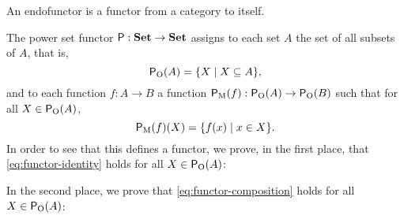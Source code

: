 \begin{definition}
  \label{def:endofunctor}

  An endofunctor is a functor from a category to itself.

\end{definition}


\begin{example}
  \label{ex:functor-power-set}


  The power set functor $\mathsf{P}: \mathbf{Set} \to \mathbf{Set}$ assigns to each set
  $A$ the set of all subsets of $A$, that is,
  \begin{equation}
    \label{eq:functor-power-set-object}
    \mathsf{P}_{\operatorname{O}}(A) = \{X \mid X \subseteq A\}
    \text{,}
  \end{equation}
  and to each function $f: A \to B$ a function $\mathsf{P}_{\operatorname{M}}(f):
  \mathsf{P}_{\operatorname{O}}(A) \to \mathsf{P}_{\operatorname{O}}(B)$ such that for all $X \in
  \mathsf{P}_{\operatorname{O}}(A)$,
  \begin{equation}
    \label{eq:functor-power-set-morphism}
    \mathsf{P}_{\operatorname{M}}(f)(X) = \{f(x) \mid x \in X\}
    \text{.}
  \end{equation}
  In order to see that this defines a functor, we prove, in the first
  place, that \eqref{eq:functor-identity} holds for all $X \in
  \mathsf{P}_{\operatorname{O}}(A)$:
  \begin{steps}
      \eqby{\eqref{eq:set-identity}}
      \eqbynothing
  \end{steps}
  In the second place, we prove that \eqref{eq:functor-composition}
  holds for all $X \in \mathsf{P}_{\operatorname{O}}(A)$:
  \begin{steps}
      \eqby{\eqref{eq:set-composition}}
      \eqby{\eqref{eq:functor-power-set-morphism}}
  \end{steps}

\end{example}

